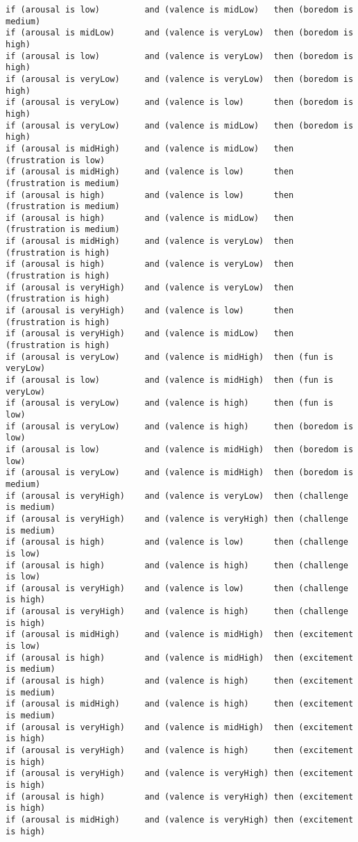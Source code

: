 \begin{lstlisting}[frame=none]
if (arousal is low)         and (valence is midLow)   then (boredom is medium)
if (arousal is midLow)      and (valence is veryLow)  then (boredom is high)
if (arousal is low)         and (valence is veryLow)  then (boredom is high)
if (arousal is veryLow)     and (valence is veryLow)  then (boredom is high)
if (arousal is veryLow)     and (valence is low)      then (boredom is high)
if (arousal is veryLow)     and (valence is midLow)   then (boredom is high)
if (arousal is midHigh)     and (valence is midLow)   then (frustration is low)
if (arousal is midHigh)     and (valence is low)      then (frustration is medium)
if (arousal is high)        and (valence is low)      then (frustration is medium)
if (arousal is high)        and (valence is midLow)   then (frustration is medium)
if (arousal is midHigh)     and (valence is veryLow)  then (frustration is high)
if (arousal is high)        and (valence is veryLow)  then (frustration is high)
if (arousal is veryHigh)    and (valence is veryLow)  then (frustration is high)
if (arousal is veryHigh)    and (valence is low)      then (frustration is high)
if (arousal is veryHigh)    and (valence is midLow)   then (frustration is high)
if (arousal is veryLow)     and (valence is midHigh)  then (fun is veryLow)
if (arousal is low)         and (valence is midHigh)  then (fun is veryLow)
if (arousal is veryLow)     and (valence is high)     then (fun is low)
if (arousal is veryLow)     and (valence is high)     then (boredom is low)
if (arousal is low)         and (valence is midHigh)  then (boredom is low)
if (arousal is veryLow)     and (valence is midHigh)  then (boredom is medium)
if (arousal is veryHigh)    and (valence is veryLow)  then (challenge is medium)
if (arousal is veryHigh)    and (valence is veryHigh) then (challenge is medium)
if (arousal is high)        and (valence is low)      then (challenge is low)
if (arousal is high)        and (valence is high)     then (challenge is low)
if (arousal is veryHigh)    and (valence is low)      then (challenge is high)
if (arousal is veryHigh)    and (valence is high)     then (challenge is high)
if (arousal is midHigh)     and (valence is midHigh)  then (excitement is low)
if (arousal is high)        and (valence is midHigh)  then (excitement is medium)
if (arousal is high)        and (valence is high)     then (excitement is medium)
if (arousal is midHigh)     and (valence is high)     then (excitement is medium)
if (arousal is veryHigh)    and (valence is midHigh)  then (excitement is high)
if (arousal is veryHigh)    and (valence is high)     then (excitement is high)
if (arousal is veryHigh)    and (valence is veryHigh) then (excitement is high)
if (arousal is high)        and (valence is veryHigh) then (excitement is high)
if (arousal is midHigh)     and (valence is veryHigh) then (excitement is high)
\end{lstlisting}

